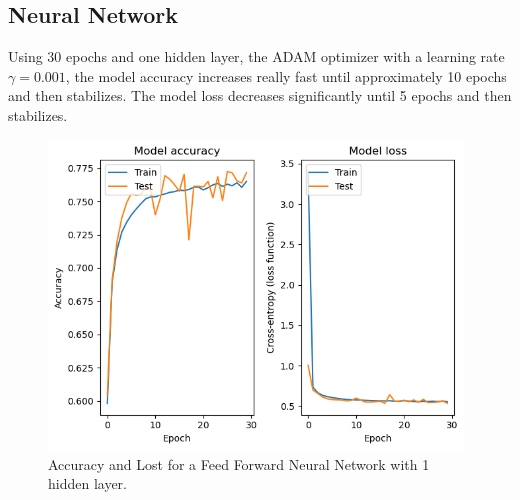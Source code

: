 \documentclass[letterpaper,12pt]{article}
\begin{document}
\subsection{Neural Network}
\par Using 30 epochs and one hidden layer, the ADAM optimizer with a learning rate $\gamma = 0.001$, the model accuracy increases really fast until approximately 10 epochs and then stabilizes. The model loss decreases significantly until 5 epochs and then stabilizes.
\begin{figure}[H]
    \centering
    \includegraphics[width=11cm]{ModelAccuracyLost_FFNN.png}
    \caption{\centering Accuracy and Lost for a Feed Forward Neural Network with 1 hidden layer.}
    \label{FFNN_AccuLost}
\end{figure}
\end{document}
